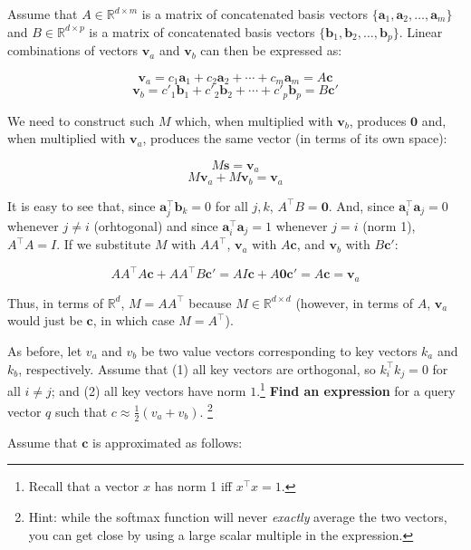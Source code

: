 \begin{parts}
\begin{subparts}
\begin{answer}
        Assume that $A\in\mathbb{R}^{d\times m}$ is a matrix of concatenated basis vectors $\{\mathbf{a}_1, \mathbf{a}_2, \ldots, \mathbf{a}_m\}$ and $B\in\mathbb{R}^{d\times p}$ is a matrix of concatenated basis vectors $\{\mathbf{b}_1, \mathbf{b}_2, \ldots, \mathbf{b}_p\}$. Linear combinations of vectors $\mathbf{v}_a$ and $\mathbf{v}_b$ can then be expressed as:
        
        $$\mathbf{v}_a = c_1 \mathbf{a}_1 + c_2 \mathbf{a}_2 + \cdots + c_m \mathbf{a}_m=A\mathbf{c}$$
        $$\mathbf{v}_b = c'_1 \mathbf{b}_1 + c'_2 \mathbf{b}_2 + \cdots + c'_p \mathbf{b}_p=B\mathbf{c'}$$
        
        We need to construct such $M$ which, when multiplied with $\mathbf{v}_b$, produces $\mathbf{0}$ and, when multiplied with $\mathbf{v}_a$, produces the same vector (in terms of its own space):
        
        $$M\mathbf{s}=\mathbf{v}_a$$
        $$M\mathbf{v}_a + M\mathbf{v}_b=\mathbf{v}_a$$
        
        It is easy to see that, since $\mathbf{a}_j^{\top}\mathbf{b}_{k}=0$ for all $j,k$, $A^{\top}B=\mathbf{0}$. And, since $\mathbf{a}_i^{\top}\mathbf{a}_{j}=0$ whenever $j\ne i$ (orhtogonal) and since $\mathbf{a}_i^{\top}\mathbf{a}_{j}=1$ whenever $j=i$ (norm 1), $A^{\top}A=I$. If we substitute $M$ with $AA^{\top}$, $\mathbf{v}_a$ with $A\mathbf{c}$, and $\mathbf{v}_b$ with $B\mathbf{c'}$:
        
        $$AA^{\top}A\mathbf{c}+AA^{\top}B\mathbf{c'}=AI\mathbf{c}+A\mathbf{0}\mathbf{c'}=A\mathbf{c}=\mathbf{v}_a$$
        
        Thus, in terms of $\mathbb{R}^{d}$, $M=AA^{\top}$ because $M\in\mathbb{R}^{d \times d}$ (however, in terms of $A$, $\mathbf{v}_a$ would just be $\mathbf{c}$, in which case $M=A^{\top}$).
\end{answer}

\subpart[4] As before, let $v_a$ and $v_b$ be two value vectors corresponding to key vectors $k_a$ and $k_b$, respectively.
Assume that (1) all key vectors are orthogonal, so $k_i^\top k_j = 0$ for all $i \neq j$; and (2) all key vectors have norm $1$.\footnote{Recall that a vector $x$ has norm 1 iff $x^\top x = 1$.}
\textbf{Find an expression} for a query vector $q$ such that $c \approx \frac{1}{2}(v_a + v_b)$. \footnote{Hint: while the softmax function will never \textit{exactly} average the two vectors, you can get close by using a large scalar multiple in the expression.} 
\begin{answer}
    Assume that $\mathbf{c}$ is approximated as follows:
    

\end{answer}
\end{subparts}
\end{parts}
